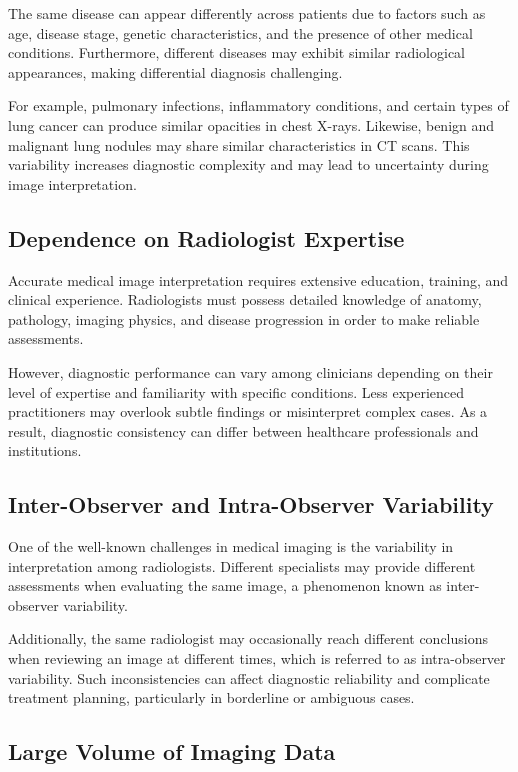 The same disease can appear differently across patients due to factors such as age, disease stage, genetic characteristics, and the presence of other medical conditions. Furthermore, different diseases may exhibit similar radiological appearances, making differential diagnosis challenging.

For example, pulmonary infections, inflammatory conditions, and certain types of lung cancer can produce similar opacities in chest X-rays. Likewise, benign and malignant lung nodules may share similar characteristics in CT scans. This variability increases diagnostic complexity and may lead to uncertainty during image interpretation.

\subsection{Dependence on Radiologist Expertise}

Accurate medical image interpretation requires extensive education, training, and clinical experience. Radiologists must possess detailed knowledge of anatomy, pathology, imaging physics, and disease progression in order to make reliable assessments.

However, diagnostic performance can vary among clinicians depending on their level of expertise and familiarity with specific conditions. Less experienced practitioners may overlook subtle findings or misinterpret complex cases. As a result, diagnostic consistency can differ between healthcare professionals and institutions.

\subsection{Inter-Observer and Intra-Observer Variability}

One of the well-known challenges in medical imaging is the variability in interpretation among radiologists. Different specialists may provide different assessments when evaluating the same image, a phenomenon known as inter-observer variability.

Additionally, the same radiologist may occasionally reach different conclusions when reviewing an image at different times, which is referred to as intra-observer variability. Such inconsistencies can affect diagnostic reliability and complicate treatment planning, particularly in borderline or ambiguous cases.

\subsection{Large Volume of Imaging Data}

